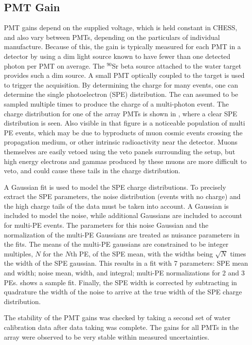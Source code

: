 \subsection{PMT Gain}
\label{pmt-gain}
PMT gains depend on the supplied voltage, which is held constant in CHESS, and also vary between PMTs, depending on the particulars of individual manufacture.
Because of this, the gain is typically measured for each PMT in a detector by using a dim light source known to have fewer than one detected photon per PMT on average.
The $^{90}$Sr beta source attached to the water target provides such a dim source.
A small PMT optically coupled to the target is used to trigger the acquisition. 
By determining the charge for many events, one can determine the single photoelectron (SPE) distribution.
The  can assumed to be sampled multiple times to produce the charge of a multi-photon event.
The charge distribution for one of the array PMTs  is shown in , where a clear SPE distribution is seen. 
Also visible in that figure is a noticeable population of multi PE events, which may be due to byproducts of muon cosmic events crossing the propagation medium, or other intrinsic radioactivity near the detector. 
Muons themselves are easily vetoed using the veto panels surrounding the setup, but high energy electrons and gammas produced by these muons are more difficult to veto, and could cause these tails in the charge distribution. 

A Gaussian fit is used to model the SPE charge distributions. 
To precisely extract the SPE parameters, the noise distribution (events with no charge) and the high charge tails of the data must be taken into account.
A Gaussian is included to model the noise, while additional Gaussians are included to account for multi-PE events. 
The parameters for this noise Gaussian and the normalization of the multi-PE Gaussians are treated as nuisance parameters in the fits.
The means of the multi-PE gaussians are constrained to be integer multiples, $N$ for the $N$th PE, of the SPE mean, with the widths being $\sqrt{N}$ times the width of the SPE gaussian.
This results in a fit with 7 parameters: SPE mean and width; noise mean, width, and integral; multi-PE normalizations for 2 and 3 PEs.
 shows a sample fit.
Finally, the SPE width is corrected by subtracting in quadrature the width of the noise to arrive at the true width of the SPE charge distribution.

The stability of the PMT gains was checked by taking a second set of water calibration data after data taking was complete.  
The gains for all PMTs in the array were observed to be very stable within measured uncertainties.

